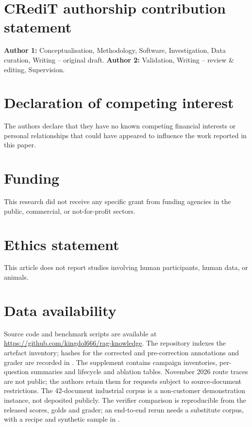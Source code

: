 
\section*{CRediT authorship contribution statement}
\textbf{Author 1:} Conceptualisation, Methodology, Software, Investigation,
Data curation, Writing -- original draft. \textbf{Author 2:} Validation,
Writing -- review \& editing, Supervision. %

\section*{Declaration of competing interest}
The authors declare that they have no known competing financial interests
or personal relationships that could have appeared to influence the work
reported in this paper.

\section*{Funding}
This research did not receive any specific grant from funding agencies in
the public, commercial, or not-for-profit sectors. %

\section*{Ethics statement}
This article does not report studies involving human participants, human
data, or animals.

\section*{Data availability}
Source code and benchmark scripts are available at
\url{https://github.com/kingdol666/rag-knowledge}. The repository indexes the
artefact inventory; hashes for the corrected and pre-correction annotations
and grader are recorded in
.
The supplement contains campaign inventories, per-question summaries and
lifecycle and ablation tables. November 2026 route traces are not public;
the authors retain them for requests subject to source-document restrictions.
The 42-document industrial corpus is a non-customer demonstration instance,
not deposited publicly. The verifier comparison is reproducible from the
released scores, golds and grader; an end-to-end rerun needs a substitute
corpus, with a recipe and synthetic sample in
.

